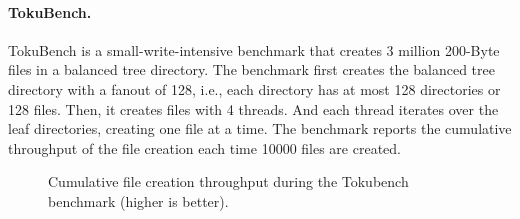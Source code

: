 \paragraph{TokuBench.}

TokuBench is a small-write-intensive benchmark that creates 3 million
200-Byte files in a balanced tree directory.
The benchmark first creates the balanced tree directory with a fanout of 128,
i.e., each directory has at most 128 directories or 128 files.
Then, it creates files with 4 threads.
And each thread iterates over the leaf directories, creating one file at a time.
The benchmark reports the cumulative throughput of the file creation each time
10000 files are created.

\newcommand{\addTokubenchPlot}[1]
{
    \addplot[
        color=\pgfkeysvalueof{/fs-colors/#1},
        line width=0.75pt,
        mark=\pgfkeysvalueof{/fs-marks/#1},
    ]
    plot[
    ]
    table[
    ]
    {./data/toku/#1.csv};
    \addlegendentry{\pgfkeysvalueof{/fs-names/#1}}
}

\begin{figure}[t]
    \caption[TokuBench benchmark]{\label{fig:toku}
        Cumulative file creation throughput during the Tokubench benchmark (higher is better).}
\end{figure}

